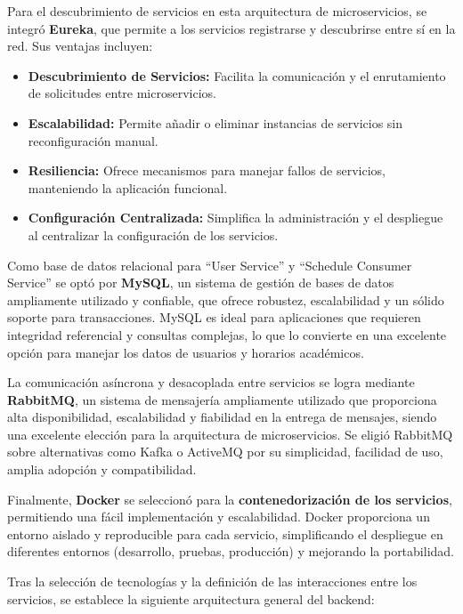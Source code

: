 Para el descubrimiento de servicios en esta arquitectura de microservicios, se integró \textbf{Eureka}, que permite a los servicios registrarse y descubrirse entre sí en la red. Sus ventajas incluyen:
\begin{itemize}
    \item \textbf{Descubrimiento de Servicios:} Facilita la comunicación y el enrutamiento de solicitudes entre microservicios.
    \item \textbf{Escalabilidad:} Permite añadir o eliminar instancias de servicios sin reconfiguración manual.
    \item \textbf{Resiliencia:} Ofrece mecanismos para manejar fallos de servicios, manteniendo la aplicación funcional.
    \item \textbf{Configuración Centralizada:} Simplifica la administración y el despliegue al centralizar la configuración de los servicios.
\end{itemize}

Como base de datos relacional para ``User Service'' y ``Schedule Consumer Service'' se optó por \textbf{MySQL}, un sistema de gestión de bases de datos ampliamente utilizado y confiable, que ofrece robustez, escalabilidad y un sólido soporte para transacciones. MySQL es ideal para aplicaciones que requieren integridad referencial y consultas complejas, lo que lo convierte en una excelente opción para manejar los datos de usuarios y horarios académicos.

La comunicación asíncrona y desacoplada entre servicios se logra mediante \textbf{RabbitMQ}, un sistema de mensajería ampliamente utilizado que proporciona alta disponibilidad, escalabilidad y fiabilidad en la entrega de mensajes, siendo una excelente elección para la arquitectura de microservicios. Se eligió RabbitMQ sobre alternativas como Kafka o ActiveMQ por su simplicidad, facilidad de uso, amplia adopción y compatibilidad.

Finalmente, \textbf{Docker} se seleccionó para la \textbf{contenedorización de los servicios}, permitiendo una fácil implementación y escalabilidad. Docker proporciona un entorno aislado y reproducible para cada servicio, simplificando el despliegue en diferentes entornos (desarrollo, pruebas, producción) y mejorando la portabilidad.

Tras la selección de tecnologías y la definición de las interacciones entre los servicios, se establece la siguiente arquitectura general del backend:


